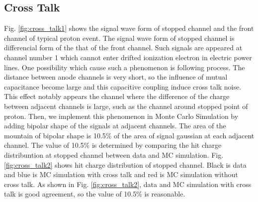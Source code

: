 \subsection{Cross Talk}

Fig. \ref{fig:cross_talk1} shows the signal wave form of stopped channel and the front channel of typical proton event.
The signal wave form of stopped channel is differencial form of the that of the front channel.
Such signals are appeared at channel number 1 which cannot enter drifted ionization electron in electric power lines.
One possibility which cause such a phenomenon is following process.
The distance between anode channels is very short,
so the influence of mutual capacitance become large
and this capacitive coupling induce cross talk noise.
This effect notably appears the channel where the difference of the charge between adjacent channels is large,
such as the channel around stopped point of proton.
Then, we implement this phenomenon in Monte Carlo Simulation
by adding bipolar shape of the signals at adjacent channels.
The area of the mountain of bipolar shape is 10.5\% of the area of signal gaussian at each adjacent channel.
The value of 10.5\% is determined by comparing the hit charge distribuntion at stopped channel between data and MC simulation.
Fig. \ref{fig:cross_talk2} shows hit charge distribution of stopped channel.
Black is data and blue is MC simulation with cross talk and red is MC simulation without cross talk.
As shown in Fig. \ref{fig:cross_talk2}, data and MC simulation with cross talk is good agreement,
so the value of 10.5\% is reasonable.

